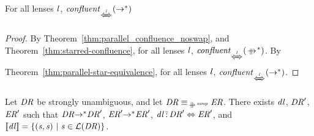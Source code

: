 \documentclass[numbers,10pt,preprint\ifanon ,nocopyrightspace\fi]{sigplanconf}
\begin{document}
\begin{corollary}
  \label{cor:rewrite-confluence}
  For all lenses $\mathit{l}$,
  $\IsConfluentWithPropertyOf{\StarOf{\Rewrite}}{\DNFLensHasSemanticsOf{\Lens}}$
\end{corollary}
\begin{proof}
  By Theorem~\ref{thm:parallel_confluence_noswap}, and
  Theorem~\ref{thm:starred-confluence},
  for all lenses $\mathit{l}$,
  $\IsConfluentWithPropertyOf
  {\StarOf{\ParallelRewrite}}{\DNFLensHasSemanticsOf{\Lens}}$.
  By Theorem~\ref{thm:parallel-star-equivalence},
  for all lenses $\mathit{l}$,
  $\IsConfluentWithPropertyOf
  {\StarOf{\Rewrite}}{\DNFLensHasSemanticsOf{\Lens}}$.
\end{proof}

\begin{lemma}
  \label{lem:parallelswapequiv-has-identity-lens}
  Let $\mathit{DR}$ be strongly unambiguous, and
  let $\DNFRegex \EquivalenceOf{\ParallelRewriteSwap} \DNFRegexAlt$.
  There exists $\mathit{dl}$, $\mathit{DR}'$, $\mathit{ER}'$ such that
  $\mathit{DR} {\rightarrow}^* \mathit{DR}'$,
  $\mathit{ER}' {\rightarrow}^* \mathit{ER}'$,
  $\mathit{dl} \,\tilde{:}\, \mathit{DR}' \Leftrightarrow \mathit{ER}'$,
  and $[ \! [\mathit{dl}] \! ] =
  \{(\mathit{s},\mathit{s}) ~|~ \mathit{s} \in \mathcal{L}(\mathit{DR})\}$.
\end{lemma}
\end{document}
